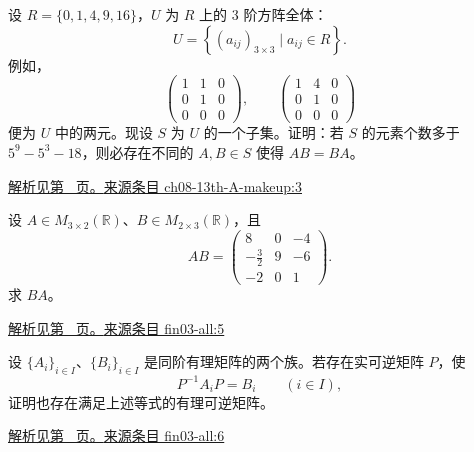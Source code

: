 \documentclass[12pt,fontset=fandol]{ctexart}
\begin{document}
\begin{example}\label{ex:ch08-13th-A-makeup:3}

设 $R=\{0,1,4,9,16\}$，$U$ 为 $R$ 上的 3 阶方阵全体：
\[
U=\left\{\left(a_{ij}\right)_{3\times 3}\mid a_{ij}\in R\right\}.
\]
例如，
\[
\begin{pmatrix}1&1&0\\ 0&1&0\\ 0&0&0\end{pmatrix},\qquad \begin{pmatrix}1&4&0\\ 0&1&0\\ 0&0&0\end{pmatrix}
\]
便为 $U$ 中的两元。现设 $S$ 为 $U$ 的一个子集。证明：若 $S$ 的元素个数多于 $5^{9}-5^{3}-18$，则必存在不同的 $A,B\in S$ 使得 $AB=BA$。

\par\hyperref[ans:ch08-13th-A-makeup:3]{解析见第~\pageref{ans:ch08-13th-A-makeup:3} 页。}\quad\href{https://github.com/lzxcr/cmc-mathematics/blob/64916fa1fdbc3e444a652eca204d5669058ee321/src/problems/preliminary/13-makeup/03.md}{来源条目 ch08-13th-A-makeup:3}

\end{example}

\begin{example}\label{ex:fin03-all:5}

设 $A\in M_{3\times2}(\mathbb R)$、$B\in M_{2\times3}(\mathbb R)$，且
\[
AB=\begin{pmatrix}8&0&-4\\-\frac32&9&-6\\-2&0&1\end{pmatrix}.
\]
求 $BA$。

\par\hyperref[ans:fin03-all:5]{解析见第~\pageref{ans:fin03-all:5} 页。}\quad\href{https://github.com/lzxcr/cmc-mathematics/blob/64916fa1fdbc3e444a652eca204d5669058ee321/src/problems/finals/03/05.md}{来源条目 fin03-all:5}

\end{example}

\begin{example}\label{ex:fin03-all:6}

设 $\{A_i\}_{i\in I}$、$\{B_i\}_{i\in I}$ 是同阶有理矩阵的两个族。若存在实可逆矩阵 $P$，使
\[
P^{-1}A_iP=B_i\qquad(i\in I),
\]
证明也存在满足上述等式的有理可逆矩阵。

\par\hyperref[ans:fin03-all:6]{解析见第~\pageref{ans:fin03-all:6} 页。}\quad\href{https://github.com/lzxcr/cmc-mathematics/blob/64916fa1fdbc3e444a652eca204d5669058ee321/src/problems/finals/03/06.md}{来源条目 fin03-all:6}

\end{example}
\end{document}
